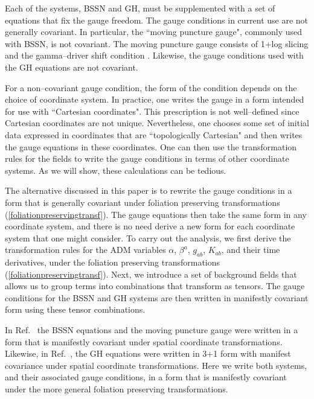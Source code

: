 \documentclass[letterpaper,nofootinbib,prd,amsmath,onecolumn]{revtex4-1}
\begin{document}
Each of the systems, BSSN and GH, must be supplemented with a set of equations that fix the gauge freedom. 
The gauge conditions in current use are not generally covariant. In particular, the ``moving puncture gauge", commonly used with BSSN, is not covariant. 
The moving puncture gauge consists of 1+log slicing \cite{Bona:1994dr} and the
gamma--driver shift condition \cite{Alcubierre:2002kk}.  Likewise, the gauge conditions used 
with the GH equations \cite{Pretorius:2006tp,Szilagyi:2009qz} are not covariant.  

For a non--covariant gauge condition, the form of the condition depends on the choice of coordinate system. 
In practice, one writes the gauge  in a form intended for use with ``Cartesian coordinates". This prescription is not  well--defined 
since Cartesian coordinates are not unique. Nevertheless, one chooses some set of initial data expressed in coordinates that are ``topologically Cartesian"  
and then writes the gauge equations in these coordinates.  One can then use the transformation rules for the fields to write the gauge conditions in terms of 
other coordinate systems. As we will show, these calculations can be tedious. 

The alternative discussed in this paper is to rewrite the gauge conditions in a form that is generally covariant under foliation preserving 
transformations (\ref{foliationpreservingtransf}). The gauge equations then take the same form in any coordinate system, and there is no need derive a new form 
for each coordinate system that one might consider. To carry out the analysis, we first derive the transformation rules for the ADM variables $\alpha$, $\beta^a$, 
$g_{ab}$, $K_{ab}$, and their time derivatives, under the foliation preserving transformations (\ref{foliationpreservingtransf}). Next, we introduce a 
set of background fields that allows us to group terms into combinations that transform as tensors. The gauge conditions for the BSSN and GH systems are 
then written in manifestly covariant form using these tensor combinations. 

In Ref.~\cite{Brown:2009dd} the BSSN equations and the moving puncture gauge were written in a form that is manifestly covariant under spatial coordinate transformations. 
Likewise, in Ref.~\cite{Brown:2011qg}, the GH equations were written in 3+1 form with manifest covariance 
under spatial coordinate transformations.  Here we write both systems, and their associated gauge conditions, in a form 
that is manifestly covariant under the more general foliation preserving transformations. 
\end{document}
